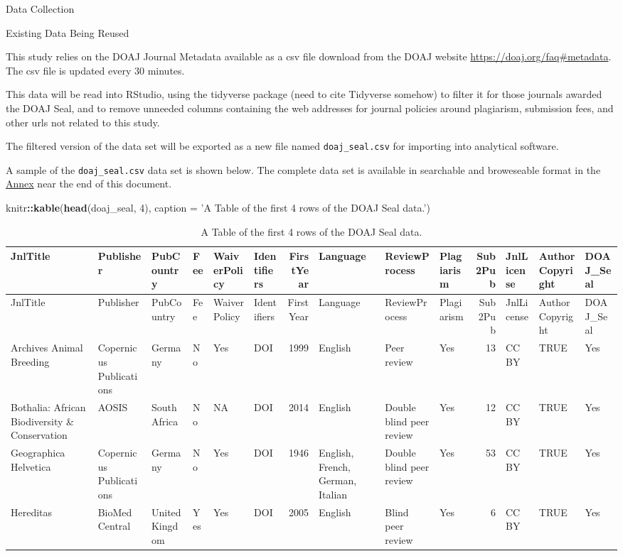 \documentclass[ignorenonframetext,]{beamer}
\newenvironment{Shaded}{\begin{snugshade}}{\end{snugshade}}
\newcommand{\KeywordTok}[1]{\textcolor[rgb]{0.13,0.29,0.53}{\textbf{#1}}}
\newcommand{\DataTypeTok}[1]{\textcolor[rgb]{0.13,0.29,0.53}{#1}}
\newcommand{\DecValTok}[1]{\textcolor[rgb]{0.00,0.00,0.81}{#1}}
\newcommand{\StringTok}[1]{\textcolor[rgb]{0.31,0.60,0.02}{#1}}
\newcommand{\OperatorTok}[1]{\textcolor[rgb]{0.81,0.36,0.00}{\textbf{#1}}}
\newcommand{\NormalTok}[1]{#1}
\begin{document}
\begin{frame}[fragile]

Data Collection

Existing Data Being Reused

This study relies on the DOAJ Journal Metadata available as a csv file
download from the DOAJ website \url{https://doaj.org/faq\#metadata}. The
csv file is updated every 30 minutes.

This data will be read into RStudio, using the tidyverse package (need
to cite Tidyverse somehow) to filter it for those journals awarded the
DOAJ Seal, and to remove unneeded columns containing the web addresses
for journal policies around plagiarism, submission fees, and other urls
not related to this study.

The filtered version of the data set will be exported as a new file
named \texttt{doaj\_seal.csv} for importing into analytical software.

A sample of the \texttt{doaj\_seal.csv} data set is shown below. The
complete data set is available in searchable and broweseable format in
the \protect\hyperlink{annex-table}{Annex} near the end of this
document.

\begin{Shaded}
\begin{Highlighting}[]
\NormalTok{knitr}\OperatorTok{::}\KeywordTok{kable}\NormalTok{(}\KeywordTok{head}\NormalTok{(doaj_seal, }\DecValTok{4}\NormalTok{), }\DataTypeTok{caption =} \StringTok{'A Table of the first 4 rows of the DOAJ Seal data.'}\NormalTok{)}
\end{Highlighting}
\end{Shaded}

\begin{longtable}[]{@{}llllllrlllrlll@{}}
\caption{A Table of the first 4 rows of the DOAJ Seal
data.}\tabularnewline
\toprule
JnlTitle & Publisher & PubCountry & Fee & WaiverPolicy & Identifiers &
FirstYear & Language & ReviewProcess & Plagiarism & Sub2Pub & JnlLicense
& AuthorCopyright & DOAJ\_Seal\tabularnewline
\midrule
\endfirsthead
\toprule
JnlTitle & Publisher & PubCountry & Fee & WaiverPolicy & Identifiers &
FirstYear & Language & ReviewProcess & Plagiarism & Sub2Pub & JnlLicense
& AuthorCopyright & DOAJ\_Seal\tabularnewline
\midrule
\endhead
Archives Animal Breeding & Copernicus Publications & Germany & No & Yes
& DOI & 1999 & English & Peer review & Yes & 13 & CC BY & TRUE &
Yes\tabularnewline
Bothalia: African Biodiversity \& Conservation & AOSIS & South Africa &
No & NA & DOI & 2014 & English & Double blind peer review & Yes & 12 &
CC BY & TRUE & Yes\tabularnewline
Geographica Helvetica & Copernicus Publications & Germany & No & Yes &
DOI & 1946 & English, French, German, Italian & Double blind peer review
& Yes & 53 & CC BY & TRUE & Yes\tabularnewline
Hereditas & BioMed Central & United Kingdom & Yes & Yes & DOI & 2005 &
English & Blind peer review & Yes & 6 & CC BY & TRUE &
Yes\tabularnewline
\bottomrule
\end{longtable}


\end{frame}
\end{document}
